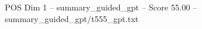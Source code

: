 \begin{textsample}{POS Dim 1 – summary\_guided\_gpt – Score 55.00 – summary\_guided\_gpt/t555\_gpt.txt}
\end{textsample}
